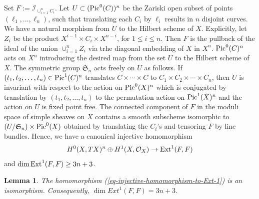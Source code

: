 \documentclass[12pt]{amsart}
\numberwithin{equation}{subsection}
\theoremstyle{plain}
\newtheorem{lem}[thm]{Lemma}
\theoremstyle{definition}
\newcommand{\fS}{{\mathfrak S}}
\newcommand{\StructureSheaf}[1]{{\mathcal O}_{#1}}
\newcommand{\Pic}{{\rm Pic}}
\newcommand{\Ext}{{\rm Ext}}
\newcommand{\Ideal}[1]{{\mathcal I}_{#1}}
\begin{document}
Set $F:=\Ideal{\cup_{i=1}^nC_i}$. 
Let $U\subset (\Pic^0(C))^n$ be the Zariski open subset of points $(\ell_1, \dots, \ell_n)$, such that translating each $C_i$ by $\ell_i$ results in $n$ disjoint curves. We have a natural morphism from $U$ to the Hilbert scheme of $X$.
Explicitly, let $Z_i$ be the product $X^{i-1}\times C_i\times X^{n-i}$, for $1\leq i\leq n$. Then $F$ is the pullback of the ideal of the union $\cup_{i=1}^nZ_i$ via trhe diagonal embedding of $X$ in $X^n$. 
$\Pic^0(C)^n$ acts on $X^n$ introducing the desired map from the set $U$ to the Hilbert scheme of $X$.
The symmetric group $\fS_n$ acts freely on $U$ as follows. If $(t_1, t_2, \dots, t_n)\in \Pic^1(C)^n$ translates $C\times \cdots \times C$ to $C_1\times C_2 \times \cdots \times C_n$, then $U$ is invariant with respect to the action on $\Pic^0(X)^n$ which is conjugated by translation by $(t_1, t_2, \dots, t_n)$ to the permutation action on $\Pic^1(X)^n$ and the action on $U$ is fixed point free.
The connected component of $F$ in the moduli space of simple sheaves on $X$ contains a smooth subscheme isomorphic to $(U/\fS_n)\times\Pic^0(X)$ obtained by translating the $C_i$'s and tensoring $F$ by line bundles. 
Hence, we have a canonical injective homomorphism
\begin{equation}
\label{eq-injective-homomorphism-to-Ext-1}
H^0(X,TX)^n\oplus H^1(X,\StructureSheaf{X})\rightarrow \Ext^1(F,F)
\end{equation}
and 
$\dim \Ext^1(F,F)\geq 3n+3$. 

\begin{lem}
\label{lemma-dim-Ext-1-F-F-is-3n+3}
The homomorphism (\ref{eq-injective-homomorphism-to-Ext-1}) is an isomorphism. Consequently, $\dim Ext^1(F,F)=3n+3$.
\end{lem}
\end{document}
